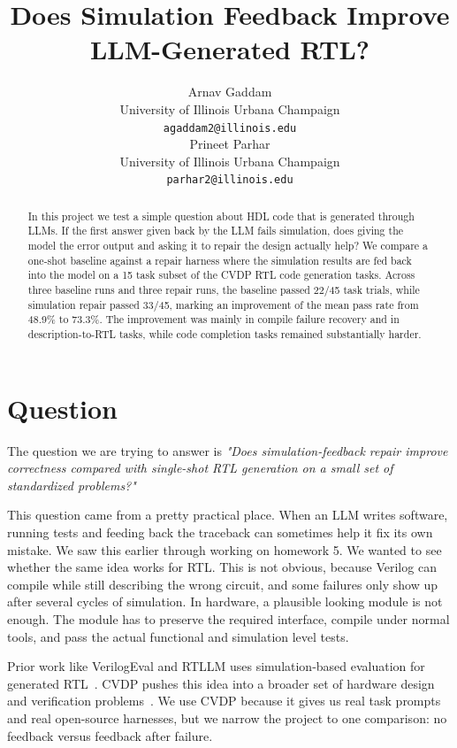 \documentclass{article}
\title{Does Simulation Feedback Improve LLM-Generated RTL?}
\author{%
  Arnav Gaddam\\
  University of Illinois Urbana Champaign\\
  \texttt{agaddam2@illinois.edu}\\
  \And
  Prineet Parhar\\
  University of Illinois Urbana Champaign\\
  \texttt{parhar2@illinois.edu}\\
}
\begin{document}
\maketitle

\begin{abstract}
In this project we test a simple question about HDL code that is generated through LLMs. If the first answer given back by the LLM fails simulation, does giving the model the error output and asking it to repair the design actually help? We compare a one-shot baseline against a repair harness where the simulation results are fed back into the model on a 15 task subset of the CVDP RTL code generation tasks. Across three baseline runs and three repair runs, the baseline passed 22/45 task trials, while simulation repair passed 33/45, marking an improvement of the mean pass rate from 48.9\% to 73.3\%. The improvement was mainly in compile failure recovery and in description-to-RTL tasks, while code completion tasks remained substantially harder.
\end{abstract}

\section{Question}

The question we are trying to answer is 
\emph{"Does simulation-feedback repair improve correctness compared with single-shot RTL generation on a small set of standardized problems?"}

This question came from a pretty practical place. When an LLM writes software, running tests and feeding back the traceback can sometimes help it fix its own mistake. We saw this earlier through working on homework 5. We wanted to see whether the same idea works for RTL. This is not obvious, because Verilog can compile while still describing the wrong circuit, and some failures only show up after several cycles of simulation. In hardware, a plausible looking module is not enough. The module has to preserve the required interface, compile under normal tools, and pass the actual functional and simulation level tests.

Prior work like VerilogEval and RTLLM uses simulation-based evaluation for generated RTL~\citep{liu2023verilogeval,lu2023rtllm}. CVDP pushes this idea into a broader set of hardware design and verification problems~\citep{pinckney2025cvdp}. We use CVDP because it gives us real task prompts and real open-source harnesses, but we narrow the project to one comparison: no feedback versus feedback after failure.
\end{document}
